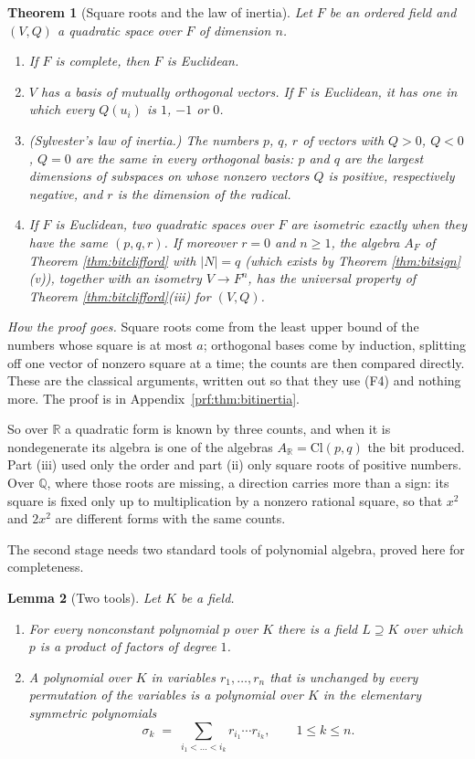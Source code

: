 \documentclass[11pt]{article}
\theoremstyle{plain}
\newtheorem{theorem}{Theorem}[section]
\newtheorem{lemma}[theorem]{Lemma}
\theoremstyle{definition}
\theoremstyle{plain}
\theoremstyle{definition}
\newcommand{\Cl}{\mathrm{Cl}}
\newcommand{\R}{\mathbb{R}}
\newcommand{\Q}{\mathbb{Q}}
\begin{document}
\begin{theorem}[Square roots and the law of inertia]\label{thm:bitinertia}
Let $F$ be an ordered field and $(V, Q)$ a quadratic space over $F$ of dimension $n$.
\begin{enumerate}
\item[(i)] If $F$ is complete, then $F$ is Euclidean.
\item[(ii)] $V$ has a basis of mutually orthogonal vectors. If $F$ is Euclidean, it has one in which every $Q(u_{i})$ is $1$, $-1$ or $0$.
\item[(iii)] \textup{(Sylvester's law of inertia.)} The numbers $p$, $q$, $r$ of vectors with $Q > 0$, $Q < 0$, $Q = 0$ are the same in every orthogonal basis: $p$ and $q$ are the largest dimensions of subspaces on whose nonzero vectors $Q$ is positive, respectively negative, and $r$ is the dimension of the radical.
\item[(iv)] If $F$ is Euclidean, two quadratic spaces over $F$ are isometric exactly when they have the same $(p, q, r)$. If moreover $r = 0$ and $n \geq 1$, the algebra $A_{F}$ of Theorem \ref{thm:bitclifford} with $|N| = q$ (which exists by Theorem \ref{thm:bitsign}(v)), together with an isometry $V \to F^{n}$, has the universal property of Theorem \ref{thm:bitclifford}(iii) for $(V, Q)$.
\end{enumerate}
\end{theorem}

\noindent\emph{How the proof goes.} Square roots come from the least upper bound of the numbers whose square is at most $a$; orthogonal bases come by induction, splitting off one vector of nonzero square at a time; the counts are then compared directly. These are the classical arguments, written out so that they use (F4) and nothing more. The proof is in Appendix~\ref{prf:thm:bitinertia}.

So over $\R$ a quadratic form is known by three counts, and when it is nondegenerate its algebra is one of the algebras $A_{\R} = \Cl(p,q)$ the bit produced. Part (iii) used only the order and part (ii) only square roots of positive numbers. Over $\Q$, where those roots are missing, a direction carries more than a sign: its square is fixed only up to multiplication by a nonzero rational square, so that $x^{2}$ and $2x^{2}$ are different forms with the same counts.

The second stage needs two standard tools of polynomial algebra, proved here for completeness.

\begin{lemma}[Two tools]\label{lem:bitpoly}
Let $K$ be a field.
\begin{enumerate}
\item[(a)] For every nonconstant polynomial $p$ over $K$ there is a field $L \supseteq K$ over which $p$ is a product of factors of degree $1$.
\item[(b)] A polynomial over $K$ in variables $r_{1}, \dots, r_{n}$ that is unchanged by every permutation of the variables is a polynomial over $K$ in the elementary symmetric polynomials
\[
\sigma_{k} \;=\; \sum_{i_{1} < \dots < i_{k}} r_{i_{1}} \cdots r_{i_{k}}, \qquad 1 \leq k \leq n .
\]
\end{enumerate}
\end{lemma}
\end{document}
